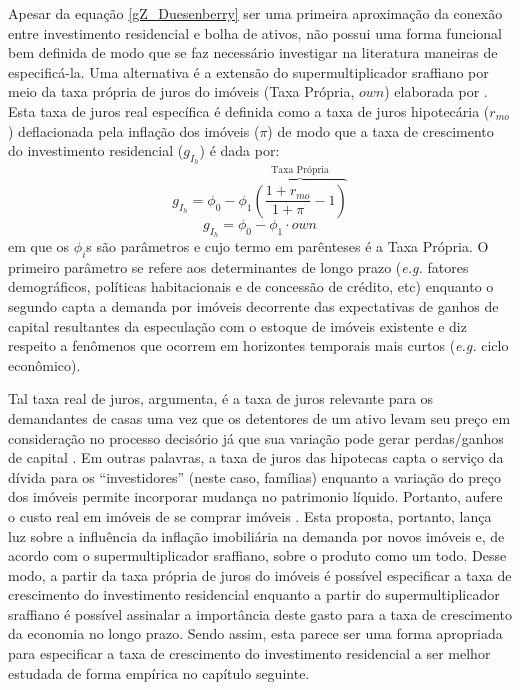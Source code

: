 Apesar da equação \ref{gZ_Duesenberry} ser uma primeira aproximação da conexão entre investimento residencial e bolha de ativos, não possui uma forma funcional bem definida de modo que se faz necessário investigar na literatura maneiras de especificá-la.
Uma alternativa é a extensão do supermultiplicador sraffiano por meio da taxa própria de juros do imóveis (Taxa Própria, $own$) elaborada por \textcite{teixeira_crescimento_2015}. 
Esta taxa de juros real específica é definida como a taxa de juros hipotecária ($r_{mo}$) deflacionada pela inflação dos imóveis ({$\pi$}) de modo que a taxa de crescimento do investimento residencial ($g_{I_h}$) é dada por:
$$
g_{I_h} = \phi_0 - \phi_1 \overbrace{\left(\frac{1+r_{mo}}{1+\pi} - 1\right)}^{\text{Taxa Própria}}
$$
\begin{equation}
\label{tx_Propria}
g_{I_h} = \phi_0 - \phi_1\cdot own
\end{equation}
em que os $\phi_i$s são parâmetros e cujo termo em parênteses é a Taxa Própria. 
O primeiro parâmetro se refere aos determinantes de longo prazo (\textit{e.g.} fatores demográficos, políticas habitacionais e de concessão de crédito, etc) enquanto o segundo capta a demanda por imóveis decorrente das expectativas de ganhos de capital resultantes da especulação com o estoque de imóveis existente e diz respeito a fenômenos que ocorrem em horizontes temporais mais curtos (\textit{e.g.} ciclo econômico). 

Tal taxa real de juros, argumenta, é a taxa de juros relevante para os demandantes de casas uma vez que os detentores de um ativo levam seu preço em consideração no processo decisório já que sua variação pode gerar perdas/ganhos de capital \cite[p.~144]{teixeira_crescimento_2015}.
Em outras palavras, a taxa de juros das hipotecas capta o serviço da dívida para os ``investidores'' (neste caso, famílias) enquanto a variação do preço dos imóveis permite incorporar mudança no patrimonio líquido. Portanto, aufere o custo real em imóveis de se comprar imóveis \cite[p.~53]{teixeira_crescimento_2015}. 
Esta proposta, portanto, lança luz sobre a influência da inflação imobiliária na demanda por novos imóveis e, de acordo com o supermultiplicador sraffiano, sobre o produto como um todo. 
Desse modo, a partir da taxa própria de juros do imóveis é possível especificar a taxa de crescimento do investimento residencial enquanto a partir do supermultiplicador sraffiano é possível assinalar a importância deste gasto para a taxa de crescimento da economia no longo prazo.  
Sendo assim, esta parece ser uma forma apropriada para especificar a taxa de crescimento do investimento residencial a ser melhor estudada de forma empírica no capítulo seguinte.

